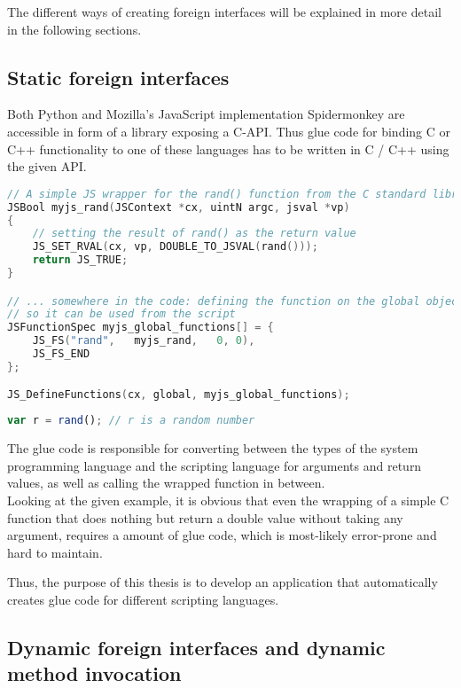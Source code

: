 The different ways of creating foreign interfaces will be explained in more detail in the following sections.

\newpage
\subsection{Static foreign interfaces}

Both Python and Mozilla's JavaScript implementation Spidermonkey are accessible in form of a library exposing a C-API. Thus glue code for binding C or C++ functionality to one of these languages has to be written in C / C++ using the given API.

\begin{lstlisting}[language=C++, caption=Exposing a C function to Spidermonkey (taken from MDN)]
// A simple JS wrapper for the rand() function from the C standard library
JSBool myjs_rand(JSContext *cx, uintN argc, jsval *vp)
{
    // setting the result of rand() as the return value
    JS_SET_RVAL(cx, vp, DOUBLE_TO_JSVAL(rand()));
    return JS_TRUE;
}

// ... somewhere in the code: defining the function on the global object
// so it can be used from the script
JSFunctionSpec myjs_global_functions[] = {
    JS_FS("rand",   myjs_rand,   0, 0),
    JS_FS_END
};

JS_DefineFunctions(cx, global, myjs_global_functions);
\end{lstlisting}

\begin{lstlisting}[language=JavaScript, caption=Using a C function from SpiderMonkey]
var r = rand();	// r is a random number
\end{lstlisting}

The glue code is responsible for converting between the types of the system programming language and the scripting language for arguments and return values, as well as calling the wrapped function in between. \\
Looking at the given example, it is obvious that even the wrapping of a simple C function that does nothing but return a double value without taking any argument, requires a  amount of glue code, which is most-likely error-prone and hard to maintain.

Thus, the purpose of this thesis is to develop an application that automatically creates glue code for different scripting languages.

\subsection{Dynamic foreign interfaces and dynamic method invocation}

